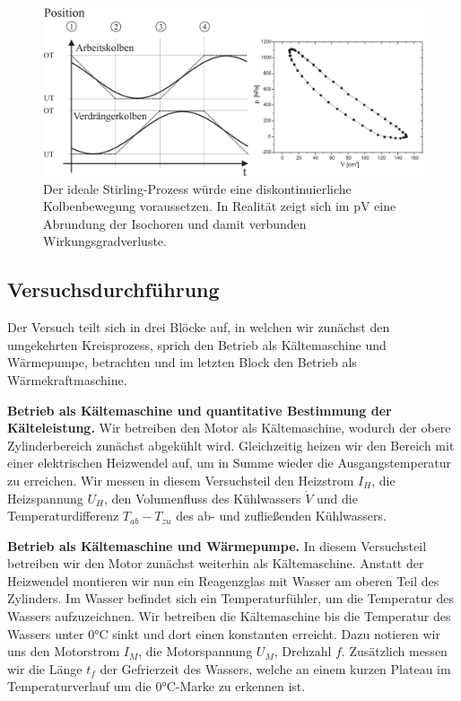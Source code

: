 \begin{figure}[H]
  \centering
  \includegraphics[width=.75\textwidth]{files/real_stirling_process.png}
  \caption{Der ideale Stirling-Prozess würde eine diskontinuierliche Kolbenbewegung voraussetzen. In Realität zeigt sich im pV eine Abrundung der Isochoren und damit verbunden Wirkungsgradverluste.}
  \label{fig:real_stirling_process}
\end{figure}
\newpage\noindent
\subsection{Versuchsdurchführung}

Der Versuch teilt sich in drei Blöcke auf, in welchen wir zunächst den umgekehrten Kreisprozess, sprich den Betrieb als Kältemaschine und Wärmepumpe, betrachten und im letzten Block den Betrieb als Wärmekraftmaschine.

\textbf{Betrieb als Kältemaschine und quantitative Bestimmung der Kälteleistung.} Wir betreiben den Motor als Kältemaschine, wodurch der obere Zylinderbereich zunächst abgekühlt wird. Gleichzeitig heizen wir den Bereich mit einer elektrischen Heizwendel auf, um in \glqq{}Summe\grqq{} wieder die Ausgangstemperatur zu erreichen. Wir messen in diesem Versuchsteil den Heizstrom $I_H$, die Heizspannung $U_H$, den Volumenfluss des Kühlwassers $\dot{V}$ und die Temperaturdifferenz $T_{ab} - T_{zu}$ des ab- und zufließenden Kühlwassers.

\textbf{Betrieb als Kältemaschine und Wärmepumpe.} In diesem Versuchsteil betreiben wir den Motor zunächst weiterhin als Kältemaschine. Anstatt der Heizwendel montieren wir nun ein Reagenzglas mit Wasser am oberen Teil des Zylinders. Im Wasser befindet sich ein Temperaturfühler, um die Temperatur des Wassers aufzuzeichnen. Wir betreiben die Kältemaschine bis die Temperatur des Wassers unter $0\si{\celsius}$ sinkt und dort einen konstanten erreicht. Dazu notieren wir uns den Motorstrom $I_M$, die Motorspannung $U_M$, Drehzahl $f$. Zusätzlich messen wir die Länge $t_f$ der Gefrierzeit des Wassers, welche an einem kurzen Plateau im Temperaturverlauf um die  $0\si{\celsius}$-Marke zu erkennen ist.


